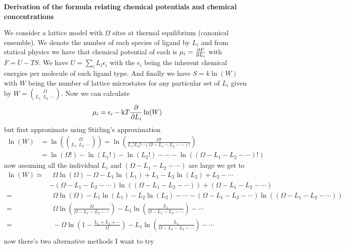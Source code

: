 \documentclass[11pt]{article}
\begin{document}
\begin{center}
	\LARGE
	\textbf{Derivation of the formula relating chemical potentials and chemical concentrations}
	\vspace{1em}
\end{center}

We consider a lattice model with $\Omega$ sites at thermal equilibrium (canonical ensemble).
We denote the number of each species of ligand by $L_i$ and from statical physics we have that chemical potential of each is $\mu_i = \pdv{F}{L_i}$ with $F = U - TS$.
We have $U = \sum_i L_i \epsilon_i$ with the $\epsilon_i$ being the inherent chemical energies per molecule of each ligand type.
And finally we have $S=\si{k}\ln(W)$ with $W$ being the number of lattice microstates for any particular set of $L_i$ given by $W=\binom{\Omega}{L_1 \enspace L_2 \enspace \cdots}$.
Now we can calculate
\begin{align}
	\mu_i = \epsilon_i - \si{k}T \pdv{L_i} \ln(W)
\end{align}
but first approximate using Stirling's approximation
\begin{align}
	\ln(W) & = \ln(\binom{\Omega}{L_1 \enspace L_2 \enspace \cdots}) = \ln(\frac{\Omega!}{L_1!L_2!\cdots(\Omega-L_1-L_2-\cdots)!}) \\
	       & = \ln(\Omega!)-\ln(L_1!)-\ln(L_2!)-\cdots-\ln((\Omega-L_1-L_2-\cdots)!)
\end{align}
now assuming all the individual $L_i$ and $(\Omega-L_1-L_2-\cdots)$ are large we get to
\begin{align}
	\ln(W) \simeq & \enspace \Omega\ln(\Omega)-\Omega -L_1\ln(L_1)+L_1 -L_2\ln(L_2)+L_2 -\cdots                                       \\
	              & -(\Omega-L_1-L_2-\cdots)\ln((\Omega-L_1-L_2-\cdots)) + (\Omega-L_1-L_2-\cdots)                                    \\
	=             & \enspace \Omega\ln(\Omega) -L_1\ln(L_1) -L_2\ln(L_2) -\cdots -(\Omega-L_1-L_2-\cdots)\ln((\Omega-L_1-L_2-\cdots)) \\
	=             & \enspace \Omega\ln(\frac{\Omega}{\Omega-L_1-L_2-\cdots}) -L_1\ln(\frac{L_1}{\Omega-L_1-L_2-\cdots}) -\cdots       \\
	=             & \enspace -\Omega\ln(1-\frac{L_1+L_2+\cdots}{\Omega}) -L_1\ln(\frac{L_1}{\Omega-L_1-L_2-\cdots}) -\cdots           \\
\end{align}
now there's two alternative methods I want to try
\end{document}
